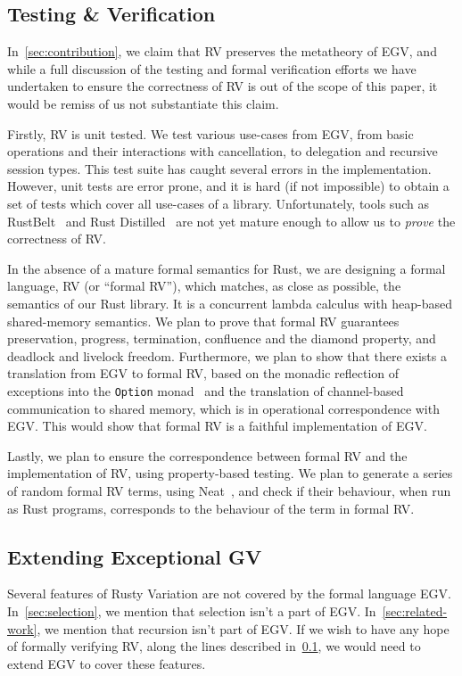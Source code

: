 \documentclass[copyright,creativecommons]{eptcs}
\begin{document}
\subsection{Testing \& Verification}\label{sec:verification}
In~\cref{sec:contribution}, we claim that RV preserves the metatheory of EGV, and while a full discussion of the testing and formal verification efforts we have undertaken to ensure the correctness of RV is out of the scope of this paper, it would be remiss of us not substantiate this claim.

Firstly, RV is unit tested. We test various use-cases from EGV, from basic operations and their interactions with cancellation, to delegation and recursive session types. This test suite has caught several errors in the implementation. However, unit tests are error prone, and it is hard (if not impossible) to obtain a set of tests which cover all use-cases of a library. Unfortunately, tools such as RustBelt~\cite{jung2017} and Rust Distilled~\cite{weiss2018} are not yet mature enough to allow us to \emph{prove} the correctness of RV.

In the absence of a mature formal semantics for Rust, we are designing a formal language, RV (or ``formal RV''), which matches, as close as possible, the semantics of our Rust library. It is a concurrent lambda calculus with heap-based shared-memory semantics. We plan to prove that formal RV guarantees preservation, progress, termination, confluence and the diamond property, and deadlock and livelock freedom. Furthermore, we plan to show that there exists a translation from EGV to formal RV, based on the monadic reflection of exceptions into the \lstinline{Option} monad~\cite{filinski1994} and the translation of channel-based communication to shared memory, which is in operational correspondence with EGV. This would show that formal RV is a faithful implementation of EGV.

Lastly, we plan to ensure the correspondence between formal RV and the implementation of RV, using property-based testing. We plan to generate a series of random formal RV terms, using Neat~\cite{claessen2015}, and check if their behaviour, when run as Rust programs, corresponds to the behaviour of the term in formal RV.

\subsection{Extending Exceptional GV}
Several features of Rusty Variation are not covered by the formal language EGV. In~\cref{sec:selection}, we mention that selection isn't a part of EGV. In~\cref{sec:related-work}, we mention that recursion isn't part of EGV. If we wish to have any hope of formally verifying RV, along the lines described in~\cref{sec:verification}, we would need to extend EGV to cover these features.



\end{document}
